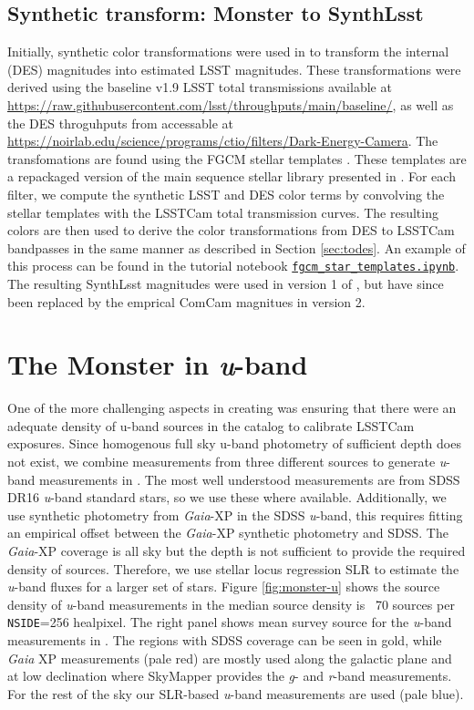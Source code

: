 \subsection{Synthetic transform: Monster to  SynthLsst}
Initially, synthetic color transformations were used in \monster to transform the internal (DES) magnitudes into estimated LSST magnitudes. 
These transformations were derived using the baseline v1.9 LSST total transmissions available at \url{https://raw.githubusercontent.com/lsst/throughputs/main/baseline/}, as well as the DES throguhputs from \citet{Abbott:2021} accessable at \url{https://noirlab.edu/science/programs/ctio/filters/Dark-Energy-Camera}.
The transfomations are found using the FGCM stellar templates \citep{Burke:2018}. 
These templates are a repackaged version of the main sequence stellar library presented in \citet{Kelly:2012}.
For each filter, we compute the synthetic LSST and DES color terms by convolving the stellar templates with the LSSTCam total transmission curves.
The resulting colors are then used to derive the color transformations from DES to LSSTCam bandpasses in the same manner as described in Section \ref{sec:todes}.
An example of this process can be found in the tutorial notebook \href{https://github.com/lsst-dm/the_monster/blob/main/notebooks/fgcm_star_templates.ipynb}{\texttt{fgcm\_star\_templates.ipynb}}.
The resulting SynthLsst magnitudes were used in version 1 of \monster, but have since been replaced by the emprical ComCam magnitues in version 2.

\section{The Monster in \textit{u}-band}
\label{sec:monster-u}
One of the more challenging aspects in creating \monster was ensuring that there were an adequate density of u-band sources in the catalog to calibrate LSSTCam exposures. 
Since homogenous full sky u-band photometry of sufficient depth does not exist, we combine measurements from three different sources to generate \textit{u}-band measurements in \monster. 
The most well understood measurements are from SDSS DR16 \textit{u}-band standard stars, so we use these where available. 
Additionally, we use synthetic photometry from \emph{Gaia}-XP in the SDSS \textit{u}-band, this requires fitting an empirical offset between the \emph{Gaia}-XP synthetic photometry and SDSS.
The  \emph{Gaia}-XP coverage is all sky but the depth is not sufficient to provide the required density of sources.
Therefore, we use stellar locus regression SLR to estimate the \textit{u}-band fluxes for a larger set of stars.
Figure \ref{fig:monster-u} shows the source density of \textit{u}-band measurements in \monster the median source density is ~70 sources per \texttt{NSIDE}=256 healpixel. 
The right panel shows mean survey source for the \textit{u}-band measurements in \monster. 
The regions with SDSS coverage can be seen in gold, while \textit{Gaia} XP measurements (pale red) are mostly used along the galactic plane and at low declination where SkyMapper provides the \emph{g}- and \emph{r}-band measurements. 
For the rest of the sky our SLR-based \textit{u}-band measurements are used (pale blue).

